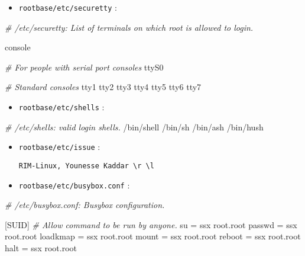 \documentclass[]{article}
\newenvironment{Shaded}{}{}
\newcommand{\CommentTok}[1]{\textcolor[rgb]{0.38,0.63,0.69}{\textit{{#1}}}}
\newcommand{\FunctionTok}[1]{\textcolor[rgb]{0.02,0.16,0.49}{{#1}}}
\newcommand{\ExtensionTok}[1]{{#1}}
\newcommand{\NormalTok}[1]{{#1}}
\providecommand{\tightlist}{%
  \setlength{\itemsep}{0pt}\setlength{\parskip}{0pt}}
\begin{document}
\begin{itemize}
\tightlist
\item
  \texttt{rootbase/etc/securetty} :
\end{itemize}

\begin{Shaded}
\begin{Highlighting}[]
\CommentTok{# /etc/securetty: List of terminals on which root is allowed to login.}

\ExtensionTok{console}

\CommentTok{# For people with serial port consoles}
\ExtensionTok{ttyS0}

\CommentTok{# Standard consoles}
\ExtensionTok{tty1}
\ExtensionTok{tty2}
\ExtensionTok{tty3}
\ExtensionTok{tty4}
\ExtensionTok{tty5}
\ExtensionTok{tty6}
\ExtensionTok{tty7}
\end{Highlighting}
\end{Shaded}

\begin{itemize}
\tightlist
\item
  \texttt{rootbase/etc/shells} :
\end{itemize}

\begin{Shaded}
\begin{Highlighting}[]
\CommentTok{# /etc/shells: valid login shells.}
\ExtensionTok{/bin/shell}
\ExtensionTok{/bin/sh}
\ExtensionTok{/bin/ash}
\ExtensionTok{/bin/hush}
\end{Highlighting}
\end{Shaded}

\begin{itemize}
\item
  \texttt{rootbase/etc/issue} :

\begin{verbatim}
RIM-Linux, Younesse Kaddar \r \l
\end{verbatim}
\item
  \texttt{rootbase/etc/busybox.conf} :
\end{itemize}

\begin{Shaded}
\begin{Highlighting}[]
\CommentTok{# /etc/busybox.conf: Busybox configuration.}

\NormalTok{[}\ExtensionTok{SUID}\NormalTok{]}
\CommentTok{# Allow command to be run by anyone.}
\FunctionTok{su} \NormalTok{= ssx root.root}
\FunctionTok{passwd} \NormalTok{= ssx root.root}
\ExtensionTok{loadkmap} \NormalTok{= ssx root.root}
\FunctionTok{mount} \NormalTok{= ssx root.root}
\ExtensionTok{reboot} \NormalTok{= ssx root.root}
\ExtensionTok{halt} \NormalTok{= ssx root.root}
\end{Highlighting}
\end{Shaded}
\end{document}
